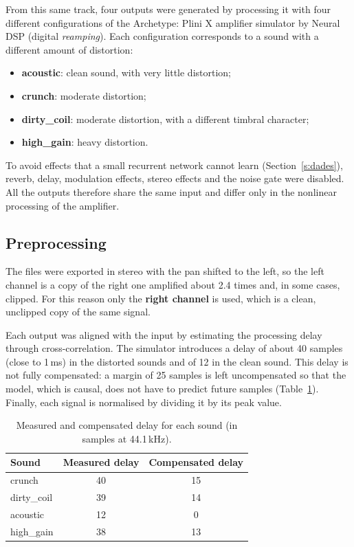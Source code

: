 \documentclass[ENG]{TFUOC}%
\begin{document}
From this same track, four outputs were generated by processing it with four different configurations of the Archetype: Plini X amplifier simulator by Neural DSP (digital \emph{reamping}). Each configuration corresponds to a sound with a different amount of distortion:
\begin{itemize}[nosep]
    \item \textbf{acoustic}: clean sound, with very little distortion;
    \item \textbf{crunch}: moderate distortion;
    \item \textbf{dirty\_coil}: moderate distortion, with a different timbral character;
    \item \textbf{high\_gain}: heavy distortion.
\end{itemize}
To avoid effects that a small recurrent network cannot learn (Section~\ref{s:dades}), reverb, delay, modulation effects, stereo effects and the noise gate were disabled. All the outputs therefore share the same input and differ only in the nonlinear processing of the amplifier.

\subsection{Preprocessing}

The files were exported in stereo with the pan shifted to the left, so the left channel is a copy of the right one amplified about 2.4 times and, in some cases, clipped. For this reason only the \textbf{right channel} is used, which is a clean, unclipped copy of the same signal.

Each output was aligned with the input by estimating the processing delay through cross-correlation. The simulator introduces a delay of about 40 samples (close to 1\,ms) in the distorted sounds and of 12 in the clean sound. This delay is not fully compensated: a margin of 25 samples is left uncompensated so that the model, which is causal, does not have to predict future samples (Table~\ref{tab:retards}). Finally, each signal is normalised by dividing it by its peak value.

\begin{table}[H]
\centering
\caption{Measured and compensated delay for each sound (in samples at 44.1\,kHz).}
\label{tab:retards}
\small
\begin{tabular}{lcc}
\toprule
\textbf{Sound} & \textbf{Measured delay} & \textbf{Compensated delay} \\
\midrule
crunch & 40 & 15 \\
dirty\_coil & 39 & 14 \\
acoustic & 12 & 0 \\
high\_gain & 38 & 13 \\
\bottomrule
\end{tabular}
\end{table}
\end{document}
